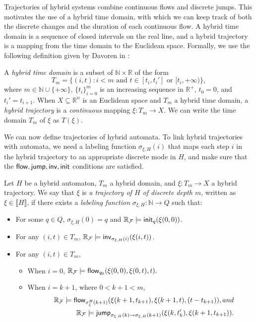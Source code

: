 \documentclass[10pt,envcountsect]{llncs}
\begin{document}
Trajectories of hybrid systems combine continuous flows and discrete jumps. This motivates the use of a hybrid time domain, with which we can keep track of both the discrete changes and the duration of each continuous flow. A hybrid time domain is a sequence of closed intervals on the real line, and a hybrid trajectory is a mapping from the time domain to the Euclidean space. Formally, we use the following definition given by Davoren in \cite{DBLP:conf/hybrid/Davoren09}:
\begin{definition}
A {\em hybrid time domain} is a subset of
 $\mathbb{N}\times \mathbb{R}$ of the form
$$T_m=\{(i, t): i<m \mbox{ and } t\in [t_i, t_i']\mbox{ or }[t_i, +\infty)\},$$
where $m\in \mathbb{N}\cup\{+\infty\}$, $\{t_i\}_{i=0}^m$ is an
increasing sequence in $\mathbb{R}^+$, $t_0= 0$, and $t_i'=t_{i+1}$. When $X\subseteq\mathbb{R}^n$ is an Euclidean space and $T_m$ a hybrid
time domain, a {\em hybrid trajectory} is a {\em continuous} mapping $\xi: T_m\rightarrow X.$ We can write the time domain $T_m$ of $\xi$ as $T(\xi)$.
 \end{definition}
We can now define trajectories of hybrid automata. To link hybrid trajectories with automata, we need a labeling function $\sigma_{\xi,H}(i)$ that maps each step $i$ in the hybrid trajectory to an appropriate discrete mode in $H$, and make sure that the $\mathsf{flow}, \mathsf{jump}, \mathsf{inv}, \mathsf{init}$ conditions are satisfied.
\begin{definition}\label{trajec}
Let $H$ be a hybrid automaton, $T_m$ a hybrid domain, and $\xi: T_m\rightarrow X$ a hybrid trajectory.
We say that $\xi$ is {\em a trajectory of $H$ of discrete depth $m$}, written as $\xi\in \llbracket H \rrbracket$, if there
exists a {\em labeling function} $\sigma_{\xi,H}: \mathbb{N}\rightarrow Q$ such
that:
\begin{itemize}
\item For some $q\in Q$, $\sigma_{\xi,H}(0) = q$ and $\mathbb{R}_{\mathcal{F}}\models \mathsf{init}_{q}(\xi(0,0))$.
\item For any $(i, t)\in T_m$, $\mathbb{R}_{\mathcal{F}}\models \mathsf{inv}_{\sigma_{\xi,H}(i)} (\xi(i,t))$.
\item For any $(i,t)\in T_m$,
\begin{itemize}
\item When $i=0$, $\mathbb{R}_{\mathcal{F}}\models\mathsf{flow}_{q_0}(\xi(0,0), \xi(0,t), t).$
\item When $i = k+1$, where $0<k+1<m$,
\begin{eqnarray*}
& &\mathbb{R}_{\mathcal{F}}\models\mathsf{flow}_{\sigma^H_{\xi}(k+1)}(\xi(k+1, t_{k+1}), \xi(k+1, t), (t - t_{k+1})), and\\
& &\mathbb{R}_{\mathcal{F}}\models \mathsf{jump}_{\sigma_{\xi,H}(k)\rightarrow\sigma_{\xi,H}(k+1)}(\xi(k, t_k'), \xi(k+1,t_{k+1})).
\end{eqnarray*}
\end{itemize}
\end{itemize}
\end{definition}
\end{document}
